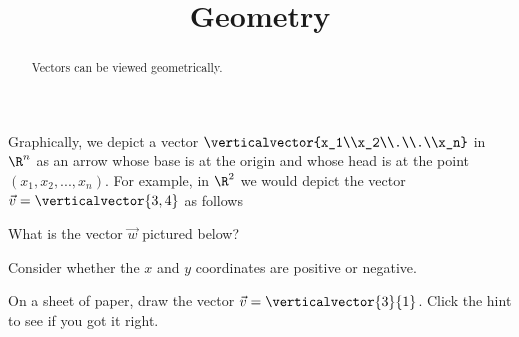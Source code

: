 \documentclass{ximera}
\title{Geometry}
\begin{document}
\begin{abstract}
  Vectors can be viewed geometrically.
\end{abstract}

Graphically, we depict a vector $\verticalvector{x_1\\x_2\\.\\.\\x_n}$
in $\R^n$ as an arrow whose base is at the origin and whose head is at
the point $(x_1,x_2,...,x_n)$.  For example, in $\R^2$ we would depict
the vector $\vec{v} = \verticalvector{3,4}$ as follows


\begin{question}
  What is the vector $\vec{w}$ pictured below?

  \begin{solution}
    \begin{hint}
      Consider whether the $x$ and $y$ coordinates are positive or negative.
    \end{hint}
    \begin{multiple-choice}
    \end{multiple-choice}
  \end{solution}
\end{question}
  	 
\begin{question}
  \begin{hint}
  \end{hint}
  On a sheet of paper, draw the vector $\vec{v} = \verticalvector{3}{1}$. Click the hint to see if you got it right.
  
\end{question}
  	 
\end{document}
